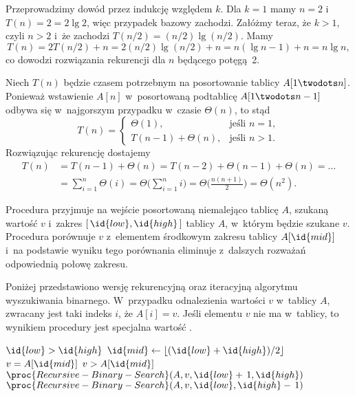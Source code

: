 \exercise{} %
Przeprowadzimy dowód przez indukcję względem $k$. Dla $k=1$ mamy $n=2$ i~$T(n)=2=2\lg2$, więc przypadek bazowy zachodzi. Załóżmy teraz, że $k>1$, czyli $n>2$ i~że zachodzi $T(n/2)=(n/2)\lg(n/2)$. Mamy
\[
	T(n) = 2T(n/2)+n = 2(n/2)\lg(n/2)+n = n(\lg n-1)+n = n\lg n,
\]
co dowodzi rozwiązania rekurencji dla $n$ będącego potęgą~2.

\exercise{} %
Niech $T(n)$ będzie czasem potrzebnym na posortowanie tablicy $A[1\twodots n]$. Ponieważ wstawienie $A[n]$ w~posortowaną podtablicę $A[1\twodots n-1]$ odbywa się w~najgorszym przypadku w~czasie $\Theta(n)$, to stąd
\[
	T(n) =
	\begin{cases}
		\Theta(1), & \text{jeśli $n=1$}, \\
		T(n-1)+\Theta(n), & \text{jeśli $n>1$}.
	\end{cases}
\]
Rozwiązując rekurencję dostajemy
\begin{align*}
	T(n) &= T(n-1)+\Theta(n) = T(n-2)+\Theta(n-1)+\Theta(n) = \dots \\
	&= \sum_{i=1}^n\Theta(i) = \Theta\biggl(\sum_{i=1}^ni\biggr) = \Theta\biggl(\frac{n(n+1)}{2}\biggr) = \Theta(n^2).
\end{align*}

\exercise{} %
Procedura  przyjmuje na wejście posortowaną niemalejąco tablicę $A$, szukaną wartość $v$ i~zakres $[\,\id{low}, \id{high}\,]$ tablicy $A$, w~którym będzie szukane $v$. Procedura porównuje $v$ z~elementem środkowym zakresu tablicy $A[\id{mid}]$ i~na podstawie wyniku tego porównania eliminuje z~dalszych rozważań odpowiednią połowę zakresu.

Poniżej przedstawiono wersję rekurencyjną oraz iteracyjną algorytmu wyszukiwania binarnego. W~przypadku odnalezienia wartości $v$ w~tablicy $A$, zwracany jest taki indeks $i$, że $A[i]=v$. Jeśli elementu $v$ nie ma w~tablicy, to wynikiem procedury jest specjalna wartość .

\begin{codebox}
\li	\If $\id{low}>\id{high}$
\li		\Then
			\Return{}
		\End
\li	$\id{mid}\gets\lfloor(\id{low}+\id{high})/2\rfloor$
\li	\If $v=A[\id{mid}]$
\li		\Then
			\Return{}
		\End
\li	\If $v>A[\id{mid}]$
\li		\Then
			\Return $\proc{Recursive-Binary-Search}(A,v,\id{low}+\,1,\id{high})$
\li		\Else
			\Return $\proc{Recursive-Binary-Search}(A,v,\id{low},\id{high}-\,1)$
		\End
\end{codebox}

